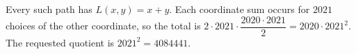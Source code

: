 Every such path has $L(x,y)=x+y$. Each coordinate sum occurs for $2021$ choices of the other coordinate, so the total is $2\cdot2021\cdot\dfrac{2020\cdot2021}{2}=2020\cdot2021^2$. The requested quotient is $\boxed{2021^2=4084441}$.
